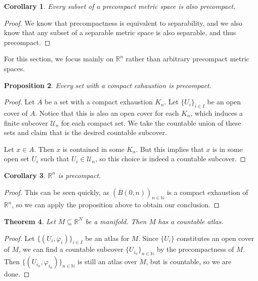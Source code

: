 \documentclass{article}
\newcommand{\cl}[1]{\overline{#1}}
\theoremstyle{plain} %
\newtheorem{thm}{Theorem}
\numberwithin{thm}{section} %
\newtheorem{prop}[thm]{Proposition}
\newtheorem{cor}[thm]{Corollary}
\theoremstyle{definition}
\begin{document}
    \begin{cor}
        Every subset of a precompact metric space is also precompact.
    \end{cor}
    \begin{proof}
        We know that precompactness is equivalent to separability, and we also know that any subset of a separable metric space is also separable, and thus precompact.
    \end{proof}
    For this section, we focus mainly on \(\mathbb{R}^n\) rather than arbitrary precompact metric spaces.
    \begin{prop}
        Every set with a compact exhaustion is precompact.
    \end{prop}
    \begin{proof}
        Let \(A\) be a set with a compact exhaustion \(K_n\). Let \(\{ U_i \} _{i \in I}\) be an open cover of \(A\). Notice that this is also an open cover for each \(K_n\), which induces a finite subcover \(\mathcal{U}_n\) for each compact set. We take the countable union of these sets and claim that is the desired countable subcover.

        Let \(x \in A\). Then \(x\) is contained in some \(K_n\). But this implies that \(x\) is in some open set \(U_i\) such that \(U_i \in \mathcal{U}_n\), so this choice is indeed a countable subcover.
    \end{proof}
    \begin{cor}
        \(\mathbb{R}^n\) is precompact.
    \end{cor}
    \begin{proof}
        This can be seen quickly, as \(\left( \cl{B}(0, n) \right)_{n \in \mathbb{N}}\) is a compact exhaustion of \(\mathbb{R}^n\), so we can apply the proposition above to obtain our conclusion.
    \end{proof}
    \begin{thm}
        Let \(M \subseteq \mathbb{R}^N\) be a manifold. Then \(M\) has a countable atlas.
    \end{thm}
    \begin{proof}
        Let \(\{ (U_i , \varphi _i) \}_{i \in I}\) be an atlas for \(M\). Since \(\{ U_i \}\) constitutes an open cover of \(M\), we can find a countable subcover \(\{ U_{i_n} \}_{n \in \mathbb{N}}\) by the precompactness of \(M\). Then \(\{ (U_{i_n}, \varphi _{i_n}) \}_{n \in \mathbb{N}}\) is still an atlas over \(M\), but is countable, so we are done.
    \end{proof}
\end{document}
